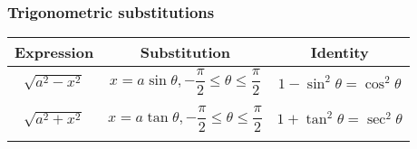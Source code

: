 \documentclass[
]{article}
\begin{document}
\hypertarget{trigonometric-substitutions}{%
\subsubsection{Trigonometric
substitutions}\label{trigonometric-substitutions}}

\begin{longtable}[]{@{}ccc@{}}
\toprule
\begin{minipage}[b]{0.30\columnwidth}\centering
Expression\strut
\end{minipage} & \begin{minipage}[b]{0.30\columnwidth}\centering
Substitution\strut
\end{minipage} & \begin{minipage}[b]{0.30\columnwidth}\centering
Identity\strut
\end{minipage}\tabularnewline
\midrule
\endhead
\begin{minipage}[t]{0.30\columnwidth}\centering
\(\sqrt{a^2-x^2}\)\strut
\end{minipage} & \begin{minipage}[t]{0.30\columnwidth}\centering
\(x = a\sin \theta, -\dfrac{\pi}{2} \leq \theta \leq \dfrac{\pi}{2}\)\strut
\end{minipage} & \begin{minipage}[t]{0.30\columnwidth}\centering
\(1 - \sin^2 \theta = \cos^2 \theta\)\strut
\end{minipage}\tabularnewline
\begin{minipage}[t]{0.30\columnwidth}\centering
\strut
\end{minipage} & \begin{minipage}[t]{0.30\columnwidth}\centering
\strut
\end{minipage} & \begin{minipage}[t]{0.30\columnwidth}\centering
\strut
\end{minipage}\tabularnewline
\begin{minipage}[t]{0.30\columnwidth}\centering
\(\sqrt{a^2+x^2}\)\strut
\end{minipage} & \begin{minipage}[t]{0.30\columnwidth}\centering
\(x = a\tan \theta, -\dfrac{\pi}{2} \leq \theta \leq \dfrac{\pi}{2}\)\strut
\end{minipage} & \begin{minipage}[t]{0.30\columnwidth}\centering
\(1 + \tan^2 \theta = \sec^2 \theta\)\strut
\end{minipage}\tabularnewline
\begin{minipage}[t]{0.30\columnwidth}\centering

\end{minipage}
\end{longtable}
\end{document}
